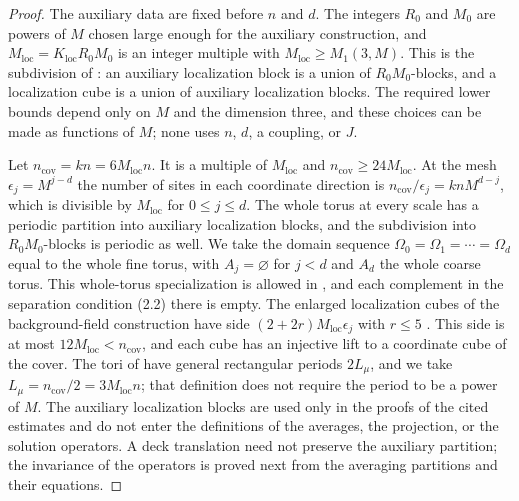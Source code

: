 \begin{proof}
The auxiliary data are fixed before $n$ and $d$. The integers $R_0$ and $M_0$ are powers of $M$ chosen large enough for the auxiliary construction, and $M_{\mathrm{loc}}=K_{\mathrm{loc}}R_0M_0$ is an integer multiple with $M_{\mathrm{loc}}\ge M_1(3,M)$. This is the subdivision of \cite[Section~3C, pp.~408--409]{Balaban1985Background}: an auxiliary localization block is a union of $R_0M_0$-blocks, and a localization cube is a union of auxiliary localization blocks. The required lower bounds depend only on $M$ and the dimension three, and these choices can be made as functions of $M$; none uses $n$, $d$, a coupling, or $J$.

Let $n_{\mathrm{cov}}=kn=6M_{\mathrm{loc}}n$. It is a multiple of $M_{\mathrm{loc}}$ and $n_{\mathrm{cov}}\ge24M_{\mathrm{loc}}$. At the mesh $\epsilon_j=M^{j-d}$ the number of sites in each coordinate direction is $n_{\mathrm{cov}}/\epsilon_j=knM^{d-j}$, which is divisible by $M_{\mathrm{loc}}$ for $0\le j\le d$. The whole torus at every scale has a periodic partition into auxiliary localization blocks, and the subdivision into $R_0M_0$-blocks is periodic as well. We take the domain sequence $\Omega_0=\Omega_1=\cdots=\Omega_d$ equal to the whole fine torus, with $A_j=\varnothing$ for $j<d$ and $A_d$ the whole coarse torus. This whole-torus specialization is allowed in \cite[(2.1)--(2.4), p.~224]{Balaban1984II}, and each complement in the separation condition (2.2) there is empty. The enlarged localization cubes of the background-field construction have side $(2+2r)M_{\mathrm{loc}}\epsilon_j$ with $r\le5$ \cite[Section~3C, pp.~408--409]{Balaban1985Background}. This side is at most $12M_{\mathrm{loc}}<n_{\mathrm{cov}}$, and each cube has an injective lift to a coordinate cube of the cover. The tori of \cite[pp.~17--18]{Balaban1984I} have general rectangular periods $2L_\mu$, and we take $L_\mu=n_{\mathrm{cov}}/2=3M_{\mathrm{loc}}n$; that definition does not require the period to be a power of $M$. The auxiliary localization blocks are used only in the proofs of the cited estimates and do not enter the definitions of the averages, the projection, or the solution operators. A deck translation need not preserve the auxiliary partition; the invariance of the operators is proved next from the averaging partitions and their equations.


\end{proof}
